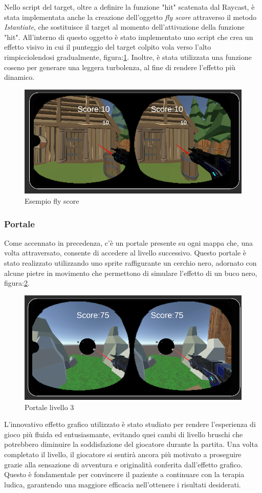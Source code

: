 \documentclass[
a4paper,
cleardoublepage=empty,
headings=twolinechapter,
numbers=autoenddot,
]{scrbook}
\begin{document}
	Nello script del target, oltre a definire la funzione "hit" scatenata dal Raycast, è stata implementata anche la creazione dell'oggetto \textit{fly score} attraverso il metodo \textit{Istantiate}, che sostituisce il target al momento dell'attivazione della funzione "hit". All'interno di questo oggetto è stato implementato uno script che crea un effetto visivo in cui il punteggio del target colpito vola verso l'alto rimpicciolendosi gradualmente, figura:\ref{fig:fly score}. Inoltre, è stata utilizzata una funzione coseno per generare una leggera turbolenza, al fine di rendere l'effetto più dinamico.
	\begin{figure}[H]
		\centering
		\includegraphics[width=0.6\linewidth]{image/fly score}
		\caption{Esempio fly score}
		\label{fig:fly score}
	\end{figure}
	\subsubsection{Portale}
  Come accennato in precedenza, c'è un portale presente su ogni mappa che, una volta attraversato, consente di accedere al livello successivo. Questo portale è stato realizzato utilizzando uno sprite raffigurante un cerchio nero, adornato con alcune pietre in movimento che permettono di simulare l'effetto di un buco nero, figura:\ref{fig:portale}.
  \begin{figure}[H]
  	\centering
  	\includegraphics[width=0.6\linewidth]{image/portale}
  	\caption{Portale livello 3}
  	\label{fig:portale}
  \end{figure}
   L'innovativo effetto grafico utilizzato è stato studiato per rendere l'esperienza di gioco più fluida ed entusiasmante, evitando quei cambi di livello bruschi che potrebbero diminuire la soddisfazione del giocatore durante la partita. Una volta completato il livello, il giocatore si sentirà ancora più motivato a proseguire grazie alla sensazione di avventura e originalità conferita dall'effetto grafico. Questo è fondamentale per convincere il paziente a continuare con la terapia ludica, garantendo una maggiore efficacia nell'ottenere i risultati desiderati.
\end{document}
